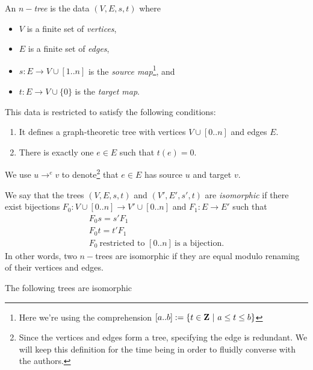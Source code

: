 %
%

\begin{defn}\label{def-tree}
	An $n-$\emph{tree} is the data $(V, E, s, t)$ where
	\begin{itemize}
		\item $V$ is a finite set of \emph{vertices},
		\item $E$ is a finite set of \emph{edges},
		\item $s : E \to V \cup [1..n]$ is the
			\emph{source map}\footnote{Here we're using the
			comprehension $[a..b] :=
			\{t \in \mathbf{Z} \ | \ a \leq t \leq b\}$}, and
		\item $t : E \to V \cup \{0\}$ is the \emph{target map}.
	\end{itemize}
	This data is restricted to satisfy the following conditions:
	\begin{enumerate}
		\item It defines a graph-theoretic tree with vertices
			$V \cup [0..n]$ and edges $E$.
		\item There is exactly one $e \in E$ such that $t(e) = 0$.
	\end{enumerate}
	We use $u \to^{e} v$ to denote\footnote{Since the vertices and
	edges form a tree,  specifying the edge is redundant. We will keep
	this definition for the time being in order to fluidly converse
	with the authors.} that $e \in E$ has source $u$ and target $v$.
\end{defn}

\begin{defn}\label{tree-iso}
	We say that the trees $(V,E,s,t)$ and $(V',E',s',t)$ are
	\emph{isomorphic} if there exist bijections $F_0 : V \cup [0..n]
	\to V' \cup [0..n]$ and $F_1 : E \to E'$ such that
	\begin{eqnarray}
		F_0s= s'F_1\\
		F_0t= t'F_1\\
		F_0\ \text{restricted to } [0..n]\ \text{is a bijection.}
	\end{eqnarray}
	In other words, two $n-$trees are isomorphic if they are equal
	modulo renaming of their vertices and edges.
\end{defn}

\begin{exl}
	The following trees are isomorphic

\end{exl}

